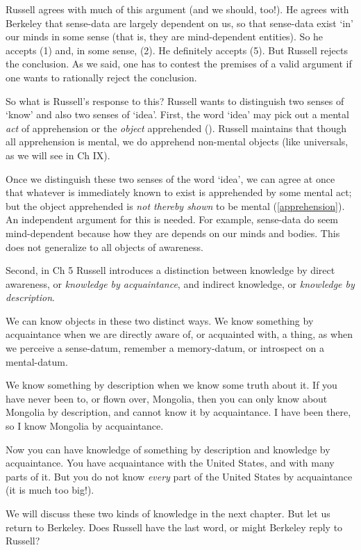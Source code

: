 \documentclass[oneside,letterpaper,12pt]{book}
\begin{document}
Russell agrees with much of this argument (and we should, too!). He agrees with Berkeley that sense-data are largely dependent on us, so that sense-data exist `in' our minds in some sense (that is, they are mind-dependent entities). So he accepts (1) and, in some sense, (2). He definitely accepts (5). But Russell rejects the conclusion. As we said, one has to contest the premises of a valid argument if one wants to rationally reject the conclusion. 

So what is Russell's response to this? Russell wants to distinguish two senses of `know' and also two senses of `idea'. First, the word `idea' may pick out a mental \textit{act} of apprehension or the \textit{object} apprehended (\pageref{act-object}). Russell maintains that though all apprehension is mental, we do apprehend non-mental objects (like universals, as we will see in Ch IX).

Once we distinguish these two senses of the word `idea', we can agree at once that whatever is immediately known to exist is apprehended by some mental act; but the object apprehended is \textit{not thereby shown} to be mental (\ref{apprehension}). An independent argument for this is needed. For example, sense-data do seem mind-dependent because how they are depends on our minds and bodies. This does not generalize to all objects of awareness.

Second, in Ch 5 Russell introduces a distinction between knowledge by direct awareness, or \textit{knowledge by acquaintance}, and indirect knowledge, or \textit{knowledge by description}. 

We can know objects in these two distinct ways. We know something by acquaintance when we are directly aware of, or acquainted with, a thing, as when we perceive a sense-datum, remember a memory-datum, or introspect on a mental-datum. 

We know something by description when we know some truth about it. If you have never been to, or flown over, Mongolia, then you can only know about Mongolia by description, and cannot know it by acquaintance. I have been there, so I know Mongolia by acquaintance.

Now you can have knowledge of something by description and knowledge by acquaintance. You have acquaintance with the United States, and with many parts of it. But you do not know \textit{every} part of the United States by acquaintance (it is much too big!).

We will discuss these two kinds of knowledge in the next chapter. But let us return to Berkeley. Does Russell have the last word, or might Berkeley reply to Russell?
\end{document}
